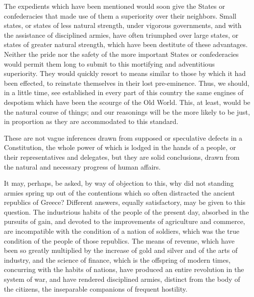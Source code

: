 The expedients which have been mentioned would soon give the States or confederacies that made use of them a superiority over their neighbors. Small states, or states of less natural strength, under vigorous governments, and with the assistance of disciplined armies, have often triumphed over large states, or states of greater natural strength, which have been destitute of these advantages. Neither the pride nor the safety of the more important States or confederacies would permit them long to submit to this mortifying and adventitious superiority. They would quickly resort to means similar to those by which it had been effected, to reinstate themselves in their lost pre-eminence. Thus, we should, in a little time, see established in every part of this country the same engines of despotism which have been the scourge of the Old World. This, at least, would be the natural course of things; and our reasonings will be the more likely to be just, in proportion as they are accommodated to this standard.

These are not vague inferences drawn from supposed or speculative defects in a Constitution, the whole power of which is lodged in the hands of a people, or their representatives and delegates, but they are solid conclusions, drawn from the natural and necessary progress of human affairs.

It may, perhaps, be asked, by way of objection to this, why did not standing armies spring up out of the contentions which so often distracted the ancient republics of Greece? Different answers, equally satisfactory, may be given to this question. The industrious habits of the people of the present day, absorbed in the pursuits of gain, and devoted to the improvements of agriculture and commerce, are incompatible with the condition of a nation of soldiers, which was the true condition of the people of those republics. The means of revenue, which have been so greatly multiplied by the increase of gold and silver and of the arts of industry, and the science of finance, which is the offspring of modern times, concurring with the habits of nations, have produced an entire revolution in the system of war, and have rendered disciplined armies, distinct from the body of the citizens, the inseparable companions of frequent hostility.

